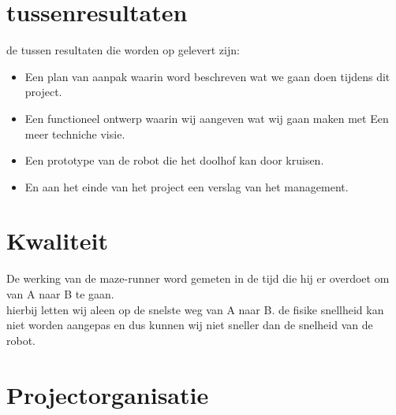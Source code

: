 \documentclass[oneside]{book}
\begin{document}
\chapter{tussenresultaten}
	de tussen resultaten die worden op gelevert zijn:
\begin{itemize}
	\item Een plan van aanpak waarin word beschreven wat we gaan doen tijdens dit project.
	\item Een functioneel ontwerp waarin wij aangeven wat wij gaan maken met Een meer techniche visie.
	\item Een prototype van de robot die het doolhof kan door kruisen.
	\item En aan het einde van het project een verslag van het management.
\end{itemize}
\clearpage
\chapter{Kwaliteit}
	De werking van de maze-runner word gemeten in de tijd die hij er overdoet om van A naar B te gaan.\\
	hierbij letten wij aleen op de snelste weg van A naar B. de fisike snellheid kan niet worden aangepas en dus kunnen wij niet sneller dan de snelheid van de robot.
\clearpage
\chapter{Projectorganisatie}

\clearpage
\end{document}
